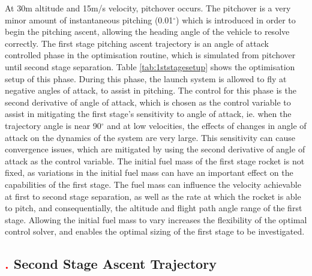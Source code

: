 At 30m altitude and 15m/s velocity, pitchover occurs. The pitchover is a very minor amount of instantaneous pitching (0.01$^\circ$) which is introduced in order to begin the pitching ascent, allowing the heading angle of the vehicle to resolve correctly. 
The first stage pitching ascent trajectory is an angle of attack controlled phase in the optimisation routine, which is simulated from pitchover until second stage separation. Table \ref{tab:1ststagesetup} shows the optimisation setup of this phase. During this phase, the launch system is allowed to fly at negative angles of attack, to assist in pitching. The control for this phase is the second derivative of angle of attack, which is chosen as the control variable to assist in mitigating the first stage's sensitivity to angle of attack, ie. when the trajectory angle is near 90$^\circ$ and at low velocities, the effects of changes in angle of attack on the dynamics of the system are very large. This sensitivity can cause convergence issues, which are mitigated by using the second derivative of angle of attack as the control variable. 
The initial fuel mass of the first stage rocket is not fixed, as variations in the initial fuel mass can have an important effect on the capabilities of the first stage. The fuel mass can influence the velocity achievable at first to second stage separation, as well as the rate at which the rocket is able to pitch, and consequentially, the altitude and flight path angle range of the first stage.
Allowing the initial fuel mass to vary increases the flexibility of the optimal control solver, and enables the optimal sizing of the first stage to be investigated. 



\subsection{\textcolor{red}{.} Second Stage Ascent Trajectory}


